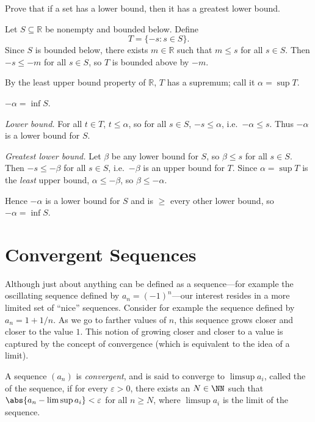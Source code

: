 \begin{exc}
	\begin{exercise}
		Prove that if a set has a lower bound, then it has a greatest lower bound.
	\end{exercise}
\begin{solution}

		Let $S \subseteq \mathbb{R}$ be nonempty and bounded below. Define
		\[
			T = \{-s : s \in S\}.
		\]
		Since $S$ is bounded below, there exists $m \in \mathbb{R}$ such that $m \le s$ for all $s \in S$. Then $-s \le -m$ for all $s \in S$, so $T$ is bounded above by $-m$.

		By the least upper bound property of $\mathbb{R}$, $T$ has a supremum; call it $\alpha = \sup T$.

		\begin{claim}
			$-\alpha = \inf S$.
		\end{claim}

		\emph{Lower bound.} For all $t \in T$, $t \le \alpha$, so for all $s \in S$, $-s \le \alpha$, i.e.\ $-\alpha \le s$. Thus $-\alpha$ is a lower bound for $S$.

		\emph{Greatest lower bound.} Let $\beta$ be any lower bound for $S$, so $\beta \le s$ for all $s \in S$. Then $-s \le -\beta$ for all $s \in S$, i.e.\ $-\beta$ is an upper bound for $T$. Since $\alpha = \sup T$ is the \emph{least} upper bound, $\alpha \le -\beta$, so $\beta \le -\alpha$.

		Hence $-\alpha$ is a lower bound for $S$ and is $\ge$ every other lower bound, so $-\alpha = \inf S$.
\end{solution}
\end{exc}

\section{Convergent Sequences}

Although just about anything can be defined as a sequence---for example the oscillating sequence
defined by $a_n = (-1)^n$---our interest resides in a more limited set of ``nice'' sequences. Consider
for example the sequence defined by $a_n = 1 + 1/n$. As we go to farther values of $n$, this
sequence grows closer and closer to the value $1$. This notion of growing closer and closer to a value
is captured by the concept of convergence (which is equivalent to the idea of a limit).

\begin{definition}
    A sequence $(a_n)$ is \emph{convergent}, and is said to converge to $\limsup a_i$, called the
    of the sequence, if for every $\varepsilon > 0$, there exists an $N \in \NN$ such that
    $\abs{a_n - \limsup a_i} < \varepsilon$ for all $n \geq N$, where $\limsup a_i$ is the limit of the sequence.
\end{definition}

